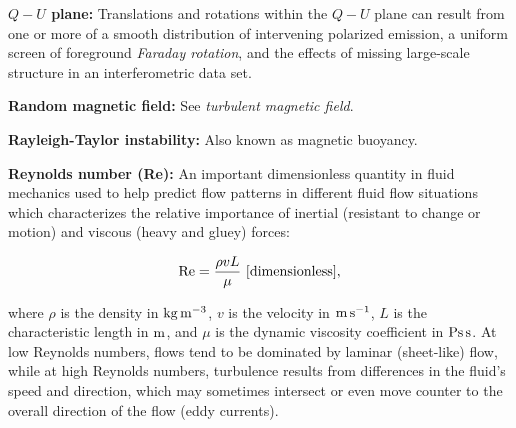 \documentclass[a4paper,10pt]{article}
\begin{document}
{\noindent}\textbf{$Q-U$ plane:} Translations and rotations within the $Q-U$ plane can result from one or more of a smooth distribution of intervening polarized emission, a uniform screen of foreground \textit{Faraday rotation}, and the effects of missing large-scale structure in an interferometric data set.

{\noindent}\textbf{Random magnetic field:} See \textit{turbulent magnetic field}. 

{\noindent}\textbf{Rayleigh-Taylor instability:} Also known as magnetic buoyancy.

{\noindent}\textbf{Reynolds number (Re):}  An important dimensionless quantity in fluid mechanics used to help predict flow patterns in different fluid flow situations which characterizes the relative importance of inertial (resistant to change or motion) and viscous (heavy and gluey) forces:

\begin{align*}
    {\rm Re} = \frac{\rho vL}{\mu} ~ [{\rm dimensionless}],
\end{align*}

{\noindent}where $\rho$ is the density in ${\rm kg\,m^{-3}}$, $v$ is the velocity in ${\rm m\,s^{-1}}$, $L$ is the characteristic length in ${\rm m}$, and $\mu$ is the dynamic viscosity coefficient in ${\rm Ps\,s}$. At low Reynolds numbers, flows tend to be dominated by laminar (sheet-like) flow, while at high Reynolds numbers, turbulence results from differences in the fluid's speed and direction, which may sometimes intersect or even move counter to the overall direction of the flow (eddy currents).
\end{document}
